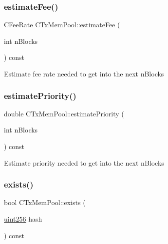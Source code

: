\mbox{\label{class_c_tx_mem_pool_a32dd66c128330aed86865c8a61857c6c}} 
\subsubsection{\texorpdfstring{estimate\+Fee()}{estimateFee()}}
{\footnotesize\ttfamily \mbox{\hyperlink{class_c_fee_rate}{C\+Fee\+Rate}} C\+Tx\+Mem\+Pool\+::estimate\+Fee (\begin{DoxyParamCaption}\item[{int}]{n\+Blocks }\end{DoxyParamCaption}) const}

Estimate fee rate needed to get into the next n\+Blocks \mbox{\label{class_c_tx_mem_pool_a225378304025c093d2dc5fcb754ade3b}} 
\subsubsection{\texorpdfstring{estimate\+Priority()}{estimatePriority()}}
{\footnotesize\ttfamily double C\+Tx\+Mem\+Pool\+::estimate\+Priority (\begin{DoxyParamCaption}\item[{int}]{n\+Blocks }\end{DoxyParamCaption}) const}

Estimate priority needed to get into the next n\+Blocks \mbox{\label{class_c_tx_mem_pool_a8b7a13b5289ab839d4460f41a7da9789}} 
\subsubsection{\texorpdfstring{exists()}{exists()}}
{\footnotesize\ttfamily bool C\+Tx\+Mem\+Pool\+::exists (\begin{DoxyParamCaption}\item[{\mbox{\hyperlink{classuint256}{uint256}}}]{hash }\end{DoxyParamCaption}) const\hspace{0.3cm}{\ttfamily [inline]}}

